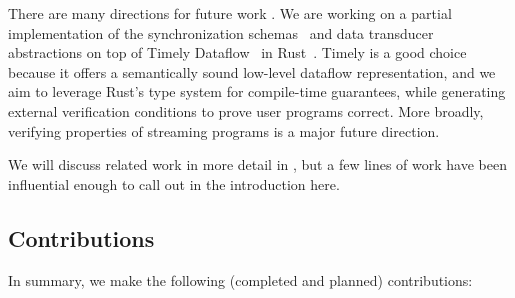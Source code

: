 There are many directions for future work . We are working on a partial implementation of the synchronization schemas~ and data transducer~ abstractions on top of Timely Dataflow~\cite{Timely,Naiad2013} in Rust~\cite{RustLang}.
Timely is a good choice because it offers a semantically sound low-level dataflow representation,
and we aim to leverage Rust's type system for compile-time guarantees,
while generating external verification conditions to prove user programs correct.
More broadly, verifying properties of streaming programs is a major future direction.

We will discuss related work in more detail in , but a few lines of work have been influential enough to call out in the introduction here.

\subsection{Contributions}

In summary, we make the following (completed and planned) contributions:

